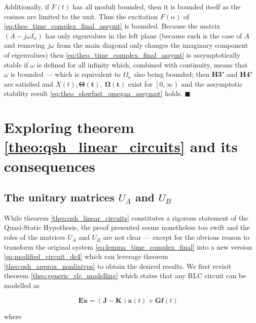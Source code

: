 	Additionally, if $F(t)$ has all moduli bounded, then it is bounded itself as the cosines are limited to the unit. Thus the excitation $F\left(\alpha\right)$ of \eqref{eq:theo_time_complex_final_assymt} is bounded. Because the matrix $\left(A-j\omega I_n\right)$ has only eigenvalues in the left plane (because such is the case of $A$ and removing $j\omega$ from the main diagonal only changes the imaginary component of eigenvalues) then \eqref{eq:theo_time_complex_final_assymt} is assymptotically stable if $\omega$ is defined for all infinity which, combined with continuity, means that $\omega$ is bounded — which is equivalent to $\Omega_a$ also being bounded; then \textbf{H3'} and \textbf{H4'} are satisfied and $X(t),\boldsymbol{\Theta(t)},\ \boldsymbol{\Omega(t)}$ exist for $\left[0,\infty\right)$ and the assymptotic stability result \eqref{eq:theo_slowfast_omegaa_assympt} holds. \hfill$\blacksquare$ %

\section{Exploring theorem \ref{theo:qsh_linear_circuits} and its consequences}%

\subsection{The unitary matrices $U_A$ and $U_B$} %

	While theorem \ref{theo:qsh_linear_circuits} constitutes a rigorous statement of the Quasi-Static Hypothesis, the proof presented seems nonetheless too swift and the roles of the matrices $U_A$ and $U_B$ are not clear — except for the obvious reason to transform the original system \eqref{eq:lemma_time_complex_final} into a new version \eqref{eq:modified_circuit_de4} which can leverage theorem \ref{theo:qsh_approx_nonlinivps} to obtain the desired results. We first revisit theorem \ref{theo:generic_rlc_modelling} which states that any RLC circuit can be modelled as

\begin{equation} \mathbf{E}\dot{\mathbf{x}} = \left(\mathbf{J-K}\right)\mathbf{x}(t) + \mathbf{Gf}(t) \end{equation}

	where

